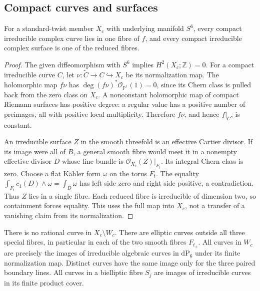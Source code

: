 \subsection{Compact curves and surfaces}\label{fam:section:D.2}
\begin{proposition}\label{fam:src:D.2.1}\label{fam:st:D.2.1}
For a standard-twist member \(X_c\) with underlying manifold \(S^6\),
every compact irreducible complex curve lies in one fibre of \(f\), and
every compact irreducible complex surface is one of the reduced fibres.
\end{proposition}

\begin{proof}
The given diffeomorphism with \(S^6\) implies \(H^2(X_c;\mathbb Z)=0\).
For a compact irreducible curve \(C\), let
\(\nu:\widetilde C\to C\hookrightarrow X_c\) be its normalization map.
The holomorphic map \(f\nu\) has
\(\deg (f\nu)^*\mathcal O_{\mathbb P^1}(1)=0\), since its Chern class is
pulled back from the zero class on \(X_c\). A nonconstant holomorphic map
of compact Riemann surfaces has positive degree: a regular value has a
positive number of preimages, all with positive local multiplicity.
Therefore \(f\nu\), and hence \(f|_C\), is constant.

An irreducible surface \(Z\) in the smooth threefold is an effective
Cartier divisor. If its image were all of \(B\), a general smooth fibre
would meet it in a nonempty effective divisor \(D\) whose line bundle
is \(\mathcal O_{X_c}(Z)|_{F_t}\). Its integral Chern class is zero.
Choose a flat K\"ahler form \(\omega\) on the torus \(F_t\). The equality
\(\int_{F_t}c_1(D)\wedge\omega=\int_D\omega\) has left side zero and right
side positive, a contradiction. Thus \(Z\) lies in a single fibre.
Each reduced fibre is irreducible of dimension two, so containment forces
equality. This uses the full map into \(X_c\), not a transfer of a
vanishing claim from its normalization.
\end{proof}

\begin{proposition}\label{fam:src:D.2.2}\label{fam:st:D.2.2}
There is no rational curve in \(X_c\setminus W_c\). There are elliptic
curves outside all three special fibres, in particular in each of the
two smooth fibres \(F_{t_\pm}\). All curves in \(W_c\) are precisely the
images of irreducible algebraic curves in \(\mathrm{dP}_6\) under its
finite normalization map. Distinct curves have the same image only for
the three paired boundary lines. All curves in a bielliptic fibre
\(S_j\) are images of irreducible curves in its finite product cover.
\end{proposition}

